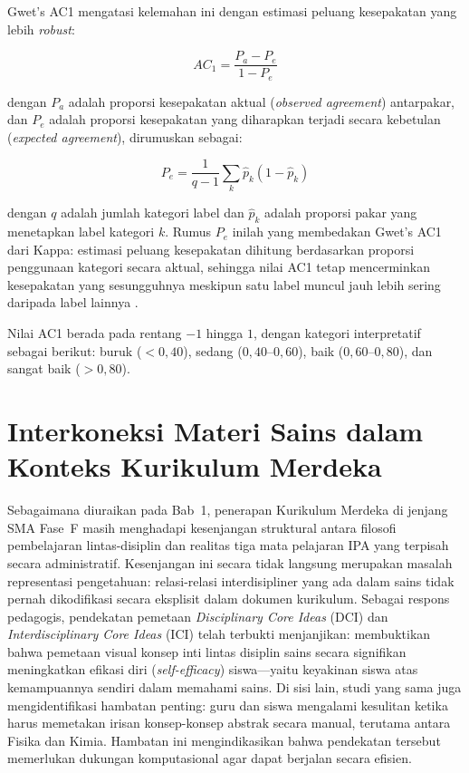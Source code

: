 \documentclass[main]{subfiles}
\begin{document}
Gwet's AC1 mengatasi kelemahan ini dengan estimasi peluang kesepakatan
yang lebih \textit{robust}:

\[
  AC_1 = \frac{P_a - P_e}{1 - P_e}
\]

\noindent dengan $P_a$ adalah proporsi kesepakatan aktual
(\textit{observed agreement}) antarpakar, dan $P_e$ adalah proporsi
kesepakatan yang diharapkan terjadi secara kebetulan (\textit{expected
agreement}), dirumuskan sebagai:

\[
  P_e = \frac{1}{q-1} \sum_{k} \hat{p}_k (1 - \hat{p}_k)
\]

\noindent dengan $q$ adalah jumlah kategori label dan $\hat{p}_k$ adalah
proporsi pakar yang menetapkan label kategori $k$. Rumus $P_e$ inilah
yang membedakan Gwet's AC1 dari Kappa: estimasi peluang kesepakatan
dihitung berdasarkan proporsi penggunaan kategori secara aktual, sehingga
nilai AC1 tetap mencerminkan kesepakatan yang sesungguhnya meskipun satu
label muncul jauh lebih sering daripada label lainnya
\parencite{mahbub_multi-stage_2026}.

Nilai AC1 berada pada rentang $-1$ hingga $1$, dengan kategori
interpretatif sebagai berikut: buruk ($<0{,}40$), sedang
($0{,}40$--$0{,}60$), baik ($0{,}60$--$0{,}80$), dan sangat baik
($>0{,}80$).

\section{Interkoneksi Materi Sains dalam Konteks Kurikulum Merdeka}

Sebagaimana diuraikan pada Bab~1, penerapan Kurikulum Merdeka di jenjang
SMA Fase~F masih menghadapi kesenjangan struktural antara filosofi
pembelajaran lintas-disiplin dan realitas tiga mata pelajaran IPA yang
terpisah secara administratif. Kesenjangan ini secara tidak langsung
merupakan masalah representasi pengetahuan: relasi-relasi
interdisipliner yang ada dalam sains tidak pernah dikodifikasi secara
eksplisit dalam dokumen kurikulum. Sebagai respons pedagogis, pendekatan
pemetaan \textit{Disciplinary Core Ideas} (DCI) dan
\textit{Interdisciplinary Core Ideas} (ICI) telah terbukti menjanjikan:
\textcite{semilarski_expanding_2022} membuktikan bahwa pemetaan visual konsep inti
lintas disiplin sains secara signifikan meningkatkan efikasi diri
(\textit{self-efficacy}) siswa---yaitu keyakinan siswa atas kemampuannya
sendiri dalam memahami sains. Di sisi lain, studi yang sama juga
mengidentifikasi hambatan penting: guru dan siswa mengalami kesulitan
ketika harus memetakan irisan konsep-konsep abstrak secara manual,
terutama antara Fisika dan Kimia. Hambatan ini mengindikasikan bahwa
pendekatan tersebut memerlukan dukungan komputasional agar dapat berjalan
secara efisien.
\end{document}
